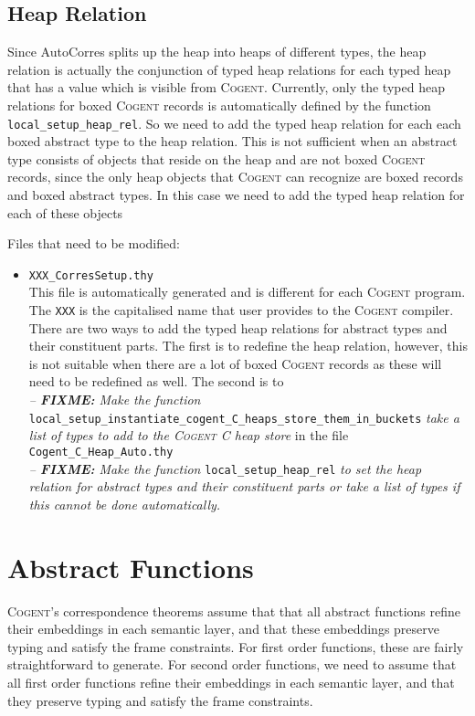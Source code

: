 \documentclass{article}
\newcommand{\cogent}{\textsc{Cogent}\xspace}
\newcommand{\Cogent}{\textsc{Cogent}\xspace}
\begin{document}
\subsection{Heap Relation}
Since AutoCorres splits up the heap into heaps of different types,
the heap relation is actually the conjunction of typed heap relations for
each typed heap that has a value which is visible from \cogent.
Currently, only the typed heap relations for boxed \Cogent records is
automatically defined by the function \verb!local_setup_heap_rel!.
So we need to add the typed heap relation for each each boxed abstract type
to the heap relation.
This is not sufficient when an abstract type consists of objects that
reside on the heap and are not boxed \cogent records,
since the only heap objects that \cogent can recognize are boxed records
and boxed abstract types.
In this case we need to add the typed heap relation for each of these objects

Files that need to be modified:
\begin{itemize}
\item \verb!XXX_CorresSetup.thy!\\
This file is automatically generated and is different for each \cogent program.
The \verb!XXX! is the capitalised name that user provides to the \cogent
compiler.
There are two ways to add the typed heap relations for abstract types and
their constituent parts.
The first is to redefine the heap relation, however, this is not suitable
when there are a lot of boxed \Cogent records as these will need to
be redefined as well.
The second is to \\
\textit{-- \textbf{FIXME:} Make the function}
\verb!local_setup_instantiate_cogent_C_heaps_store_them_in_buckets!
\textit{take a list of types to add to the \cogent C heap store} in the file \verb!Cogent_C_Heap_Auto.thy!\\
\textit{-- \textbf{FIXME:} Make the function} \verb!local_setup_heap_rel!
\textit{to set the heap relation for abstract types and their constituent
parts or take a list of types if this cannot be done
automatically.}
\end{itemize}

\section{Abstract Functions}
\Cogent's correspondence theorems assume that that all abstract functions
refine their embeddings in each semantic layer,
and that these embeddings preserve typing and satisfy the frame constraints.
For first order functions, these are fairly straightforward to generate.
For second order functions, we need to assume that all first order
functions refine their embeddings in each semantic layer,
and that they preserve typing and satisfy the frame constraints.
\end{document}
